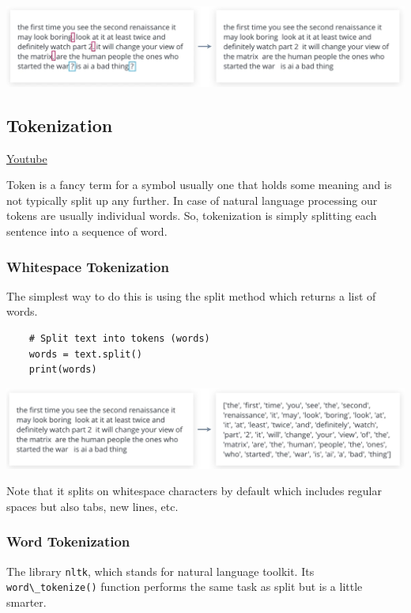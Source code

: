 \includegraphics[width=1\linewidth]{img//rnn//intro/punctuation_removal.png}

\subsection{Tokenization}
\href{https://www.youtube.com/watch?v=4Ieotbeh4u8&t=1s&ab_channel=Udacity}{Youtube}\newline

Token is a fancy term for a symbol usually one that holds some meaning and is not typically split up any further. In case of natural language processing our tokens are usually individual words. So, tokenization is simply splitting each sentence into a sequence of word. 

\subsubsection{Whitespace Tokenization}

The simplest way to do this is using the split method which returns a list of words.

\begin{lstlisting}
    # Split text into tokens (words)
    words = text.split()
    print(words)
\end{lstlisting}

\includegraphics[width=1\linewidth]{img//rnn//intro/whitespace_tokenization.png}

Note that it splits on whitespace characters by default which includes regular spaces but also tabs, new lines, etc.

\subsubsection{Word Tokenization}

The library \lstinline{nltk}, which stands for natural language toolkit. Its \lstinline{word\_tokenize()} function performs the same task as split but is a little smarter. 

